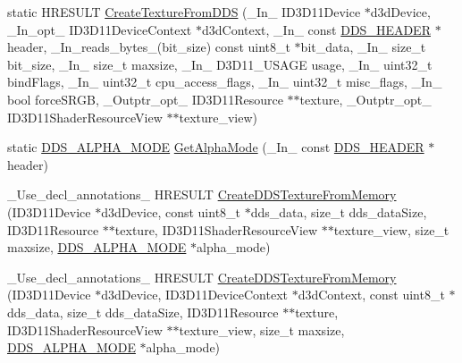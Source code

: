 \begin{DoxyCompactItemize}
\item 
static H\+R\+E\+S\+U\+LT \hyperlink{namespacemage_a1abae840c6e112b20872c3c0bb2a6442}{Create\+Texture\+From\+D\+DS} (\+\_\+\+In\+\_\+ I\+D3\+D11\+Device $\ast$d3d\+Device, \+\_\+\+In\+\_\+opt\+\_\+ I\+D3\+D11\+Device\+Context $\ast$d3d\+Context, \+\_\+\+In\+\_\+ const \hyperlink{structmage_1_1_d_d_s___h_e_a_d_e_r}{D\+D\+S\+\_\+\+H\+E\+A\+D\+ER} $\ast$header, \+\_\+\+In\+\_\+reads\+\_\+bytes\+\_\+(bit\+\_\+size) const uint8\+\_\+t $\ast$bit\+\_\+data, \+\_\+\+In\+\_\+ size\+\_\+t bit\+\_\+size, \+\_\+\+In\+\_\+ size\+\_\+t maxsize, \+\_\+\+In\+\_\+ D3\+D11\+\_\+\+U\+S\+A\+GE usage, \+\_\+\+In\+\_\+ uint32\+\_\+t bind\+Flags, \+\_\+\+In\+\_\+ uint32\+\_\+t cpu\+\_\+access\+\_\+flags, \+\_\+\+In\+\_\+ uint32\+\_\+t misc\+\_\+flags, \+\_\+\+In\+\_\+ bool force\+S\+R\+GB, \+\_\+\+Outptr\+\_\+opt\+\_\+ I\+D3\+D11\+Resource $\ast$$\ast$texture, \+\_\+\+Outptr\+\_\+opt\+\_\+ I\+D3\+D11\+Shader\+Resource\+View $\ast$$\ast$texture\+\_\+view)
\item 
static \hyperlink{namespacemage_a0c586a2bad862f4858900ca121ca80c2}{D\+D\+S\+\_\+\+A\+L\+P\+H\+A\+\_\+\+M\+O\+DE} \hyperlink{namespacemage_afcc0891e1660f8457696cb30f4ee518a}{Get\+Alpha\+Mode} (\+\_\+\+In\+\_\+ const \hyperlink{structmage_1_1_d_d_s___h_e_a_d_e_r}{D\+D\+S\+\_\+\+H\+E\+A\+D\+ER} $\ast$header)
\item 
\+\_\+\+Use\+\_\+decl\+\_\+annotations\+\_\+ H\+R\+E\+S\+U\+LT \hyperlink{namespacemage_aa3dfb149c30fcaad9aafc80a5fc06440}{Create\+D\+D\+S\+Texture\+From\+Memory} (I\+D3\+D11\+Device $\ast$d3d\+Device, const uint8\+\_\+t $\ast$dds\+\_\+data, size\+\_\+t dds\+\_\+data\+Size, I\+D3\+D11\+Resource $\ast$$\ast$texture, I\+D3\+D11\+Shader\+Resource\+View $\ast$$\ast$texture\+\_\+view, size\+\_\+t maxsize, \hyperlink{namespacemage_a0c586a2bad862f4858900ca121ca80c2}{D\+D\+S\+\_\+\+A\+L\+P\+H\+A\+\_\+\+M\+O\+DE} $\ast$alpha\+\_\+mode)
\item 
\+\_\+\+Use\+\_\+decl\+\_\+annotations\+\_\+ H\+R\+E\+S\+U\+LT \hyperlink{namespacemage_a9b5a7a7773e9f46894c7180ddd34b2ce}{Create\+D\+D\+S\+Texture\+From\+Memory} (I\+D3\+D11\+Device $\ast$d3d\+Device, I\+D3\+D11\+Device\+Context $\ast$d3d\+Context, const uint8\+\_\+t $\ast$dds\+\_\+data, size\+\_\+t dds\+\_\+data\+Size, I\+D3\+D11\+Resource $\ast$$\ast$texture, I\+D3\+D11\+Shader\+Resource\+View $\ast$$\ast$texture\+\_\+view, size\+\_\+t maxsize, \hyperlink{namespacemage_a0c586a2bad862f4858900ca121ca80c2}{D\+D\+S\+\_\+\+A\+L\+P\+H\+A\+\_\+\+M\+O\+DE} $\ast$alpha\+\_\+mode)
\item 

\end{DoxyCompactItemize}

